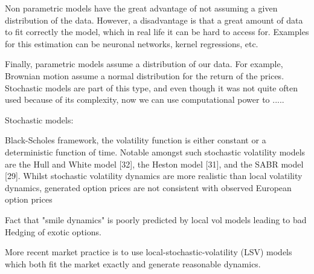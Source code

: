 Non parametric models have the great advantage of not assuming a given distribution of the data. However, a disadvantage is that a great amount of data to fit correctly the model, which in real life it can be hard to access for. Examples for this estimation can be neuronal networks, kernel regressions, etc.

Finally, parametric models assume a distribution of our data. For example, Brownian motion assume a normal distribution for the return of the prices. Stochastic models are part of this type, and even though it was not quite often used because of its complexity, now we can use computational power to .....


Stochastic models:

Black-Scholes framework, the volatility function is either constant or a deterministic function of time.  Notable amongst such stochastic volatility models are the Hull and White model [32], the
Heston model [31], and the SABR model [29]. Whilst stochastic volatility
dynamics are more realistic than local volatility dynamics, generated option
prices are not consistent with observed European option prices

Fact that "smile dynamics" is poorly predicted by local vol models leading to bad Hedging of exotic options.

More recent market practice is to use local-stochastic-volatility
(LSV) models which both fit the market exactly and generate reasonable
dynamics.
